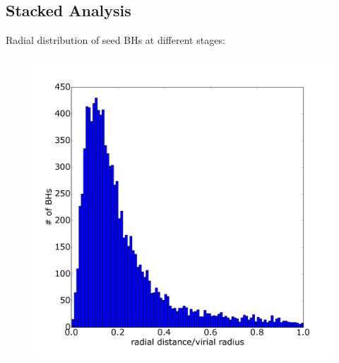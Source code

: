 \documentclass[useAMS,usenatbib]{mn2e}
\begin{document}
\subsection{Stacked Analysis}
Radial distribution of seed BHs at different stages:
\begin{minipage}{\linewidth}
\end{minipage}
\begin{figure}
  \centering
  \includegraphics[width=0.8\columnwidth]{rad_dist14.png}
\end{figure}
\end{document}
